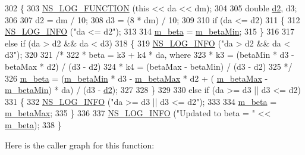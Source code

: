 \begin{DoxyCode}
302 \{
303   \hyperlink{log-macros-disabled_8h_a90b90d5bad1f39cb1b64923ea94c0761}{NS\_LOG\_FUNCTION} (\textcolor{keyword}{this} << da << dm);
304 
305   \textcolor{keywordtype}{double} \hyperlink{lte__cqi__generation_8m_a479b78c01efbe4664b402a300da492f7}{d2}, d3;
306 
307   d2 = dm / 10;
308   d3 = (8 * dm) / 10;
309 
310   \textcolor{keywordflow}{if} (da <= d2)
311     \{
312       \hyperlink{group__logging_gafbd73ee2cf9f26b319f49086d8e860fb}{NS\_LOG\_INFO} (\textcolor{stringliteral}{"da <= d2"});
313 
314       \hyperlink{classns3_1_1TcpIllinois_a0d605879dbf76bb97647d9e993e78a59}{m\_beta} = \hyperlink{classns3_1_1TcpIllinois_a3c0c450a135f937b79940f82c67313d9}{m\_betaMin};
315     \}
316 
317   \textcolor{keywordflow}{else} \textcolor{keywordflow}{if} (da > d2 && da < d3)
318     \{
319       \hyperlink{group__logging_gafbd73ee2cf9f26b319f49086d8e860fb}{NS\_LOG\_INFO} (\textcolor{stringliteral}{"da > d2 && da < d3"});
320 
321       \textcolor{comment}{/*}
322 \textcolor{comment}{       * beta = k3 + k4 * da, where}
323 \textcolor{comment}{       * k3 = (betaMin * d3 - betaMax * d2) / (d3 - d2)}
324 \textcolor{comment}{       * k4 = (betaMax - betaMin) / (d3 - d2)}
325 \textcolor{comment}{       */}
326       \hyperlink{classns3_1_1TcpIllinois_a0d605879dbf76bb97647d9e993e78a59}{m\_beta} = (\hyperlink{classns3_1_1TcpIllinois_a3c0c450a135f937b79940f82c67313d9}{m\_betaMin} * d3 - \hyperlink{classns3_1_1TcpIllinois_a8c27408a958faaf52111b0f62b8c81a5}{m\_betaMax} * d2 + (
      \hyperlink{classns3_1_1TcpIllinois_a8c27408a958faaf52111b0f62b8c81a5}{m\_betaMax} - \hyperlink{classns3_1_1TcpIllinois_a3c0c450a135f937b79940f82c67313d9}{m\_betaMin}) * da) / (d3 - \hyperlink{lte__cqi__generation_8m_a479b78c01efbe4664b402a300da492f7}{d2});
327 
328     \}
329 
330   \textcolor{keywordflow}{else} \textcolor{keywordflow}{if} (da >= d3 || d3 <= d2)
331     \{
332       \hyperlink{group__logging_gafbd73ee2cf9f26b319f49086d8e860fb}{NS\_LOG\_INFO} (\textcolor{stringliteral}{"da >= d3 || d3 <= d2"});
333 
334       \hyperlink{classns3_1_1TcpIllinois_a0d605879dbf76bb97647d9e993e78a59}{m\_beta} = \hyperlink{classns3_1_1TcpIllinois_a8c27408a958faaf52111b0f62b8c81a5}{m\_betaMax};
335     \}
336 
337   \hyperlink{group__logging_gafbd73ee2cf9f26b319f49086d8e860fb}{NS\_LOG\_INFO} (\textcolor{stringliteral}{"Updated to beta = "} << \hyperlink{classns3_1_1TcpIllinois_a0d605879dbf76bb97647d9e993e78a59}{m\_beta});
338 \}
\end{DoxyCode}


Here is the caller graph for this function\+:


